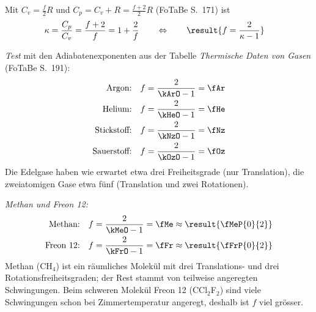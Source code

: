 Mit $C_v = \frac{f}{2}R$ und $C_p = C_v + R = \frac{f+2}{2}R$ (FoTaBe S.~171) ist
\begin{align}
 \kappa &= \frac{C_p}{C_v} = \frac{f+2}{f} = 1+\frac{2}{f}
 \qquad\Leftrightarrow\qquad
 \result{f = \frac{2}{\kappa-1}}
\end{align}

\emph{Test} mit den Adiabatenexponenten aus der Tabelle \emph{Thermische Daten von Gasen} (FoTaBe S.~191):
\begin{align}
 \text{Argon:}\quad f &= \frac{2}{\kArO-1} = \fAr \\
 \text{Helium:}\quad f &= \frac{2}{\kHeO-1} = \fHe \\
 \text{Stickstoff:}\quad f &= \frac{2}{\kNzO-1} = \fNz \\
 \text{Sauerstoff:}\quad f &= \frac{2}{\kOzO-1} = \fOz
\end{align}
Die Edelgase haben wie erwartet etwa drei Freiheitsgrade (nur Translation), die zweiatomigen Gase etwa fünf (Translation und zwei Rotationen).

\emph{Methan und Freon 12:}
\begin{align}
 \text{Methan:}\quad f &= \frac{2}{\kMeO-1} = \fMe \approx \result{\fMeP{0}{2}} \\
 \text{Freon 12:}\quad f &= \frac{2}{\kFrO-1} = \fFr \approx \result{\fFrP{0}{2}}
\end{align}
Methan (CH$_4$) ist ein räumliches Molekül mit drei Translations- und drei Rotationsfreiheitsgraden; der Rest stammt von teilweise angeregten Schwingungen. Beim schweren Molekül Freon 12 (CCl$_2$F$_2$) sind viele Schwingungen schon bei Zimmertemperatur angeregt, deshalb ist $f$ viel grösser.
